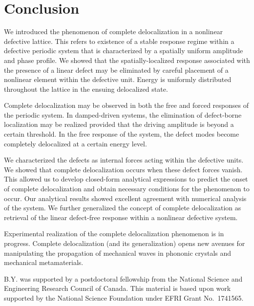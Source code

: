 \documentclass[aps,pre,twocolumn,groupedaddress]{revtex4-1}
\begin{document}
\section{Conclusion}
\label{sec:conclusion}

We introduced the phenomenon of complete delocalization in a nonlinear defective lattice. {\color{black}This refers to existence of a stable response regime within a defective periodic system that is characterized by a spatially uniform amplitude and phase profile}. We showed that the spatially-localized response associated with the presence of a linear defect may be eliminated by careful placement of a nonlinear element within the defective unit. 
{\color{black}
Energy is uniformly distributed throughout the lattice in the ensuing delocalized state. 
}

Complete delocalization may be observed in both the free and forced responses of the periodic system. In damped-driven systems, the elimination of defect-borne localization may be realized provided that the driving amplitude is beyond a certain threshold. In the free response of the system, the defect modes become completely delocalized at a certain energy level. 

{\color{black}
We characterized the defects as internal forces acting within the defective units. We showed that complete delocalization occurs when these defect forces vanish. This allowed us to develop closed-form analytical expressions to predict the onset of complete delocalization and obtain necessary conditions for the phenomenon to occur. Our analytical results showed excellent agreement with numerical analysis of the system. We further generalized the concept of complete delocalization as retrieval of the linear defect-free response within a nonlinear defective system.
}

Experimental realization of the complete delocalization phenomenon is in progress. 
Complete delocalization {\color{black}(and its generalization)} opens new avenues for manipulating the propagation of mechanical waves in phononic crystals and mechanical metamaterials. %



\begin{acknowledgments}
B.Y. was supported by a postdoctoral fellowship from the National Science and Engineering Research Council of Canada. 
This material is based upon work supported by the National Science Foundation under EFRI Grant No.~1741565.
\end{acknowledgments}


\end{document}

